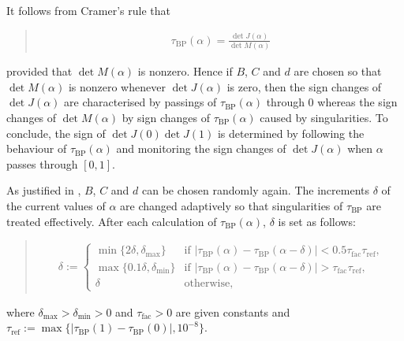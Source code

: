 \documentclass[a4paper,11pt,english]{sphinxmanual}
\begin{document}
It follows from Cramer’s rule that
\begin{quote}
\begin{equation*}
\begin{split}\tau_{\mathrm{BP}}(\alpha) = \frac{\det J(\alpha)}{\det M(\alpha)}\end{split}
\end{equation*}\end{quote}

provided that \(\det M(\alpha)\) is non\sphinxhyphen{}zero. Hence if \(B\), \(C\)
and \(d\) are chosen so that \(\det M(\alpha)\) is non\sphinxhyphen{}zero whenever
\(\det J(\alpha)\) is zero, then the sign changes of \(\det J(\alpha)\)
are characterised by passings of \(\tau_{\mathrm{BP}}(\alpha)\) through 0
whereas the sign changes of \(\det M(\alpha)\) by sign changes of
\(\tau_{\mathrm{BP}}(\alpha)\) caused by singularities. To conclude, the
sign of \(\det J(0)\det J(1)\) is determined by following the
behaviour of \(\tau_{\mathrm{BP}}(\alpha)\) and monitoring the sign changes
of \(\det J(\alpha)\) when \(\alpha\) passes through \([0,1]\).

As justified in , \(B\), \(C\) and \(d\) can be
chosen randomly again. The increments \(\delta\) of the current values of
\(\alpha\) are changed adaptively so that singularities of
\(\tau_{\mathrm{BP}}\) are treated effectively. After each calculation of
\(\tau_{\mathrm{BP}}(\alpha)\), \(\delta\) is set as follows:
\begin{quote}
\begin{equation*}
\begin{split}\delta := \begin{cases}\min\{2\delta, \delta_{\mathrm{max}}\}& \text{if $\lvert \tau_{\mathrm{BP}}(\alpha) - \tau_{\mathrm{BP}}(\alpha - \delta) \rvert < 0.5 \tau_{\mathrm{fac}} \tau_{\mathrm{ref}}$,}\\ \max\{0.1\delta, \delta_{\mathrm{min}}\}& \text{if $\lvert \tau_{\mathrm{BP}}(\alpha) - \tau_{\mathrm{BP}}(\alpha - \delta) \rvert > \tau_{\mathrm{fac}} \tau_{\mathrm{ref}}$,}\\ \delta& \text{otherwise},\end{cases}\end{split}
\end{equation*}\end{quote}

where \(\delta_{\mathrm{max}} > \delta_{\mathrm{min}} > 0\) and
\(\tau_{\mathrm{fac}} > 0\) are given constants and
\(\tau_{\mathrm{ref}} := \max\{\lvert \tau_{\mathrm{BP}}(1) - \tau_{\mathrm{BP}}(0) \rvert, 10^{-8}\}\).
\end{document}
